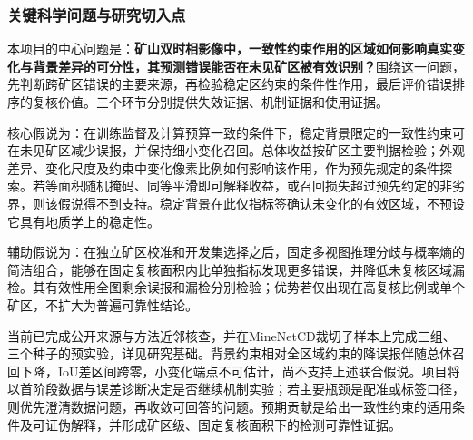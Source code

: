 \subsubsection{关键科学问题与研究切入点}
本项目的中心问题是：\textbf{矿山双时相影像中，一致性约束作用的区域如何影响真实变化与背景差异的可分性，其预测错误能否在未见矿区被有效识别？}围绕这一问题，先判断跨矿区错误的主要来源，再检验稳定区约束的条件性作用，最后评价错误排序的复核价值。三个环节分别提供失效证据、机制证据和使用证据。

核心假说为：在训练监督及计算预算一致的条件下，稳定背景限定的一致性约束可在未见矿区减少误报，并保持细小变化召回。总体收益按矿区主要判据检验；外观差异、变化尺度及约束中变化像素比例如何影响该作用，作为预先规定的条件探索。若等面积随机掩码、同等平滑即可解释收益，或召回损失超过预先约定的非劣界，则该假说得不到支持。稳定背景在此仅指标签确认未变化的有效区域，不预设它具有地质学上的稳定性。

辅助假说为：在独立矿区校准和开发集选择之后，固定多视图推理分歧与概率熵的简洁组合，能够在固定复核面积内比单独指标发现更多错误，并降低未复核区域漏检。其有效性用全图剩余误报和漏检分别检验；优势若仅出现在高复核比例或单个矿区，不扩大为普遍可靠性结论。

当前已完成公开来源与方法近邻核查，并在MineNetCD裁切子样本上完成三组、三个种子的预实验，详见研究基础。背景约束相对全区域约束的降误报伴随总体召回下降，IoU差区间跨零，小变化端点不可估计，尚不支持上述联合假说。项目将以首阶段数据与误差诊断决定是否继续机制实验；若主要瓶颈是配准或标签口径，则优先澄清数据问题，再收敛可回答的问题。预期贡献是给出一致性约束的适用条件及可证伪解释，并形成矿区级、固定复核面积下的检测可靠性证据。
